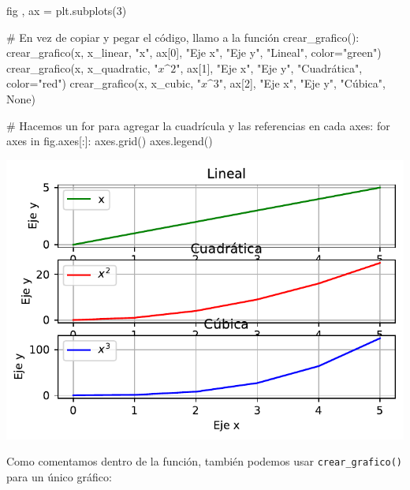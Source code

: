 \documentclass[
  letterpaper,
  DIV=11,
  numbers=noendperiod]{scrreprt}
\newenvironment{Shaded}{\begin{snugshade}}{\end{snugshade}}
\newcommand{\CommentTok}[1]{\textcolor[rgb]{0.37,0.37,0.37}{#1}}
\newcommand{\ControlFlowTok}[1]{\textcolor[rgb]{0.00,0.23,0.31}{#1}}
\newcommand{\DecValTok}[1]{\textcolor[rgb]{0.68,0.00,0.00}{#1}}
\newcommand{\KeywordTok}[1]{\textcolor[rgb]{0.00,0.23,0.31}{#1}}
\newcommand{\NormalTok}[1]{\textcolor[rgb]{0.00,0.23,0.31}{#1}}
\newcommand{\OperatorTok}[1]{\textcolor[rgb]{0.37,0.37,0.37}{#1}}
\newcommand{\StringTok}[1]{\textcolor[rgb]{0.13,0.47,0.30}{#1}}
\newcommand{\VariableTok}[1]{\textcolor[rgb]{0.07,0.07,0.07}{#1}}
\begin{document}
\begin{Shaded}
\begin{Highlighting}[]
\NormalTok{fig , ax }\OperatorTok{=}\NormalTok{ plt.subplots(}\DecValTok{3}\NormalTok{)}

\CommentTok{\# En vez de copiar y pegar el código, llamo a la función crear\_grafico():}
\NormalTok{crear\_grafico(x, x\_linear, }\StringTok{"x"}\NormalTok{, ax[}\DecValTok{0}\NormalTok{], }\StringTok{"Eje x"}\NormalTok{, }\StringTok{"Eje y"}\NormalTok{, }\StringTok{"Lineal"}\NormalTok{, color}\OperatorTok{=}\StringTok{"green"}\NormalTok{)}
\NormalTok{crear\_grafico(x, x\_quadratic, }\StringTok{"$x\^{}2$"}\NormalTok{, ax[}\DecValTok{1}\NormalTok{], }\StringTok{"Eje x"}\NormalTok{, }\StringTok{"Eje y"}\NormalTok{, }\StringTok{"Cuadrática"}\NormalTok{, color}\OperatorTok{=}\StringTok{"red"}\NormalTok{)}
\NormalTok{crear\_grafico(x, x\_cubic, }\StringTok{"$x\^{}3$"}\NormalTok{, ax[}\DecValTok{2}\NormalTok{], }\StringTok{"Eje x"}\NormalTok{, }\StringTok{"Eje y"}\NormalTok{, }\StringTok{"Cúbica"}\NormalTok{, }\VariableTok{None}\NormalTok{)}

\CommentTok{\# Hacemos un for para agregar la cuadrícula y las referencias en cada axes:}
\ControlFlowTok{for}\NormalTok{ axes }\KeywordTok{in}\NormalTok{ fig.axes[:]:}
\NormalTok{  axes.grid()}
\NormalTok{  axes.legend()}
\end{Highlighting}
\end{Shaded}

\includegraphics{unidad_6_files/figure-pdf/cell-128-output-1.pdf}

Como comentamos dentro de la función, también podemos usar
\texttt{crear\_grafico()} para un único gráfico:
\end{document}
